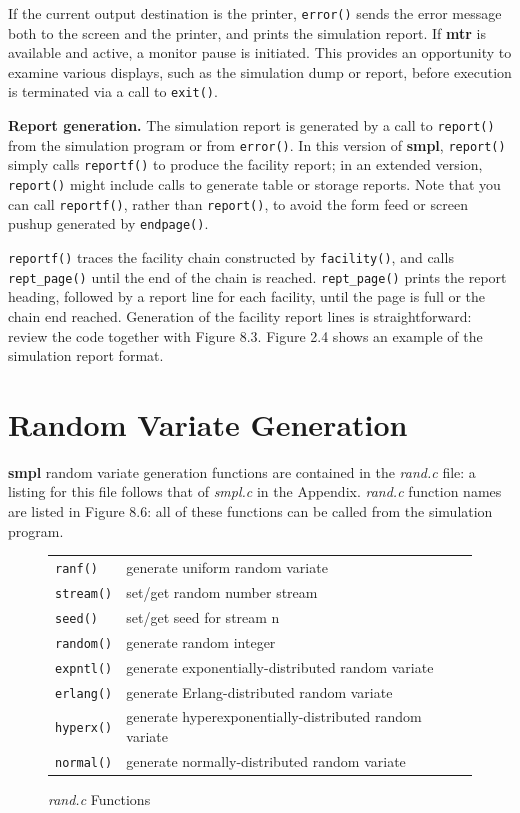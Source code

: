 If the current output destination is the printer, \texttt{error()} sends the error
message both to the screen and the printer, and prints the simulation report.
If \textbf{mtr} is available and active, a monitor pause is initiated. This provides an
opportunity to examine various displays, such as the simulation dump or
report, before execution is terminated via a call to \texttt{exit()}.

\textbf{Report generation.} The simulation report is generated by a call to
\texttt{report()} from the simulation program or from \texttt{error()}. In this version of
\textbf{smpl}, \texttt{report()} simply calls \texttt{reportf()} to produce the facility report; in
an extended version, \texttt{report()} might include calls to generate table or
storage reports. Note that you can call \texttt{reportf()}, rather than \texttt{report()},
to avoid the form feed or screen pushup generated by \texttt{endpage()}.

\texttt{reportf()} traces the facility chain constructed by \texttt{facility()}, and
calls \texttt{rept\_page()} until the end of the chain is reached. \texttt{rept\_page()}
prints the report heading, followed by a report line for each facility, until
the page is full or the chain end reached. Generation of the facility report
lines is straightforward: review the code together with Figure 8.3. Figure
2.4 shows an example of the simulation report format.

\section{Random Variate Generation}

\textbf{smpl} random variate generation functions are contained in the \textit{rand.c}
file: a listing for this file follows that of \textit{smpl.c} in the Appendix. \textit{rand.c}
function names are listed in Figure 8.6: all of these functions can be called
from the simulation program.

\begin{figure}[htbp]
\centering\small
\begin{tabular}{@{}lp{}@{}}
\texttt{ranf()} & generate uniform random variate\\
\texttt{stream()} & set/get random number stream\\
\texttt{seed()} & set/get seed for stream n\\
\texttt{random()} & generate random integer\\
\texttt{expntl()} & generate exponentially-distributed random variate\\
\texttt{erlang()} & generate Erlang-distributed random variate\\
\texttt{hyperx()} & generate hyperexponentially-distributed random variate\\
\texttt{normal()} & generate normally-distributed random variate
\end{tabular}
\caption{\textit{rand.c} Functions}
\end{figure}

